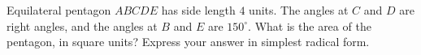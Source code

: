 Equilateral pentagon $ABCDE$ has side length $4$ units. The angles at $C$ and $D$ are right angles, and the angles at $B$ and $E$ are $150^\circ$. What is the area of the pentagon, in square units? Express your answer in simplest radical form.
